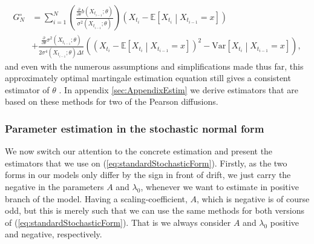 \begin{align}
    G_N^{\circ} &= \sum_{i = 1}^N 
    \left(
        \frac{\frac{\partial}{\partial\theta} b\left(X_{t_{i-1}};\theta\right)}{\sigma^2\left(X_{t_{i-1}};\theta\right)}
    \right) \left(X_{t_{i}} - \mathbb{E}\left[X_{t_{i}} \middle| X_{t_{i-1}} = x\right]\right) \nonumber \\
    &+ \frac{\frac{\partial}{\partial\theta}\sigma^2\left(X_{t_{i-1}}; \theta\right)}{2\sigma^4\left(X_{t_{i - 1}}; \theta\right)\Delta t}\left(\left(X_{t_{i}} - \mathbb{E}\left[X_{t_{i}} \middle| X_{t_{i-1}} = x\right]\right)^2 - \textrm{Var}\left[X_{t_{i}} \middle| X_{t_{i-1}} = x\right]\right),\label{eq:approximatelyOptimalMartingale}
\end{align}
and even with the numerous assumptions and simplifications made thus far, this approximately optimal martingale estimation equation still gives a consistent estimator of $\theta$ \cite[p.19]{StatisticalMethodsForSDE}. In appendix \ref{sec:AppendixEstim} we derive estimators that are based on these methods for two of the Pearson diffusions.
\subsubsection{Parameter estimation in the stochastic normal form}
We now switch our attention to the concrete estimation and present the estimators that we use on (\ref{eq:standardStochasticForm}). Firstly, as the two forms in our models only differ by the sign in front of drift, we just carry the negative in the parameters $A$ and $\lambda_0$, whenever we want to estimate in positive branch of the model. Having a scaling-coefficient, $A$, which is negative is of course odd, but this is merely such that we can use the same methods for both versions of (\ref{eq:standardStochasticForm}). That is we always consider $A$ and $\lambda_0$ positive and negative, respectively.

